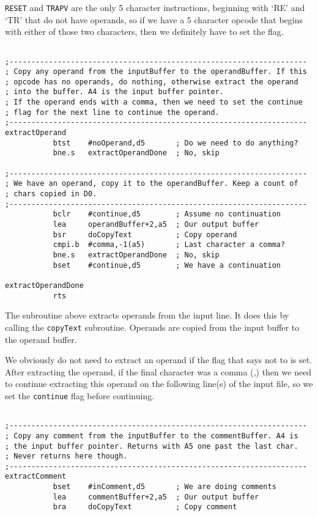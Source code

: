 \texttt{RESET} and \texttt{TRAPV} are the only 5 character instructions, beginning with `RE' and `TR' that do not have operands, so if we have a 5 character opcode that begins with either of those two characters, then we definitely have to set the flag.

\begin{lstlisting}[firstnumber=last,caption={ASMReformat Source - Extracting Operands}]

;--------------------------------------------------------------------
; Copy any operand from the inputBuffer to the operandBuffer. If this
; opcode has no operands, do nothing, otherwise extract the operand
; into the buffer. A4 is the input buffer pointer.
; If the operand ends with a comma, then we need to set the continue
; flag for the next line to continue the operand.
;--------------------------------------------------------------------
extractOperand
           btst    #noOperand,d5       ; Do we need to do anything?
           bne.s   extractOperandDone  ; No, skip

;--------------------------------------------------------------------
; We have an operand, copy it to the operandBuffer. Keep a count of 
; chars copied in D0.
;--------------------------------------------------------------------
           bclr    #continue,d5        ; Assume no continuation
           lea     operandBuffer+2,a5  ; Our output buffer
           bsr     doCopyText          ; Copy operand
           cmpi.b  #comma,-1(a5)       ; Last character a comma?
           bne.s   extractOperandDone  ; No, skip
           bset    #continue,d5        ; We have a continuation

extractOperandDone
           rts
\end{lstlisting}

The subroutine above extracts operands from the input line. It does this by calling the \texttt{copyText} subroutine. Operands are copied from the input buffer to the operand buffer.

We obviously do not need to extract an operand if the flag that says not to is set. After extracting the operand, if the final character was a comma (,) then we need to continue extracting this operand on the following line(s) of the input file, so we set the \texttt{continue} flag before continuing.

\begin{lstlisting}[firstnumber=last,caption={ASMReformat Source - Extracting Comments}]

;--------------------------------------------------------------------
; Copy any comment from the inputBuffer to the commentBuffer. A4 is 
; the input buffer pointer. Returns with A5 one past the last char.
; Never returns here though.
;--------------------------------------------------------------------
extractComment
           bset    #inComment,d5       ; We are doing comments
           lea     commentBuffer+2,a5  ; Our output buffer
           bra     doCopyText          ; Copy comment
\end{lstlisting}

